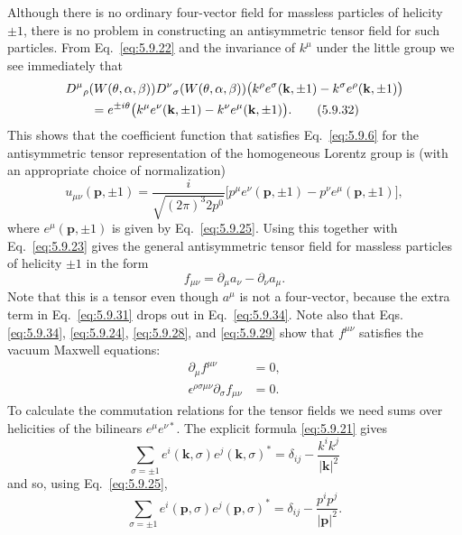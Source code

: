 Although there is no ordinary four-vector field for massless particles of
helicity $\pm1$, there is no problem in constructing an antisymmetric tensor
field for such particles. From Eq.~\eqref{eq:5.9.22} and the invariance of $k^\mu$ under
the little group we see immediately that
\begin{align}
&D^\mu{}_\rho(W(\theta,\alpha,\beta))
D^\nu{}_\sigma(W(\theta,\alpha,\beta))
\bigl(k^\rho e^\sigma(\mathbf k,\pm1)-k^\sigma e^\rho(\mathbf k,\pm1)\bigr)
\notag\\
&\qquad=e^{\pm i\theta}
\bigl(k^\mu e^\nu(\mathbf k,\pm1)-k^\nu e^\mu(\mathbf k,\pm1)\bigr).
\tag{5.9.32}\label{eq:5.9.32}
\end{align}
This shows that the coefficient function that satisfies Eq.~\eqref{eq:5.9.6} for the
antisymmetric tensor representation of the homogeneous Lorentz group is (with
an appropriate choice of normalization)
\begin{equation}
u_{\mu\nu}(\mathbf p,\pm1)=\frac{i}{\sqrt{(2\pi)^3 2p^0}}
\bigl[p^\mu e^\nu(\mathbf p,\pm1)-p^\nu e^\mu(\mathbf p,\pm1)\bigr],
\tag{5.9.33}\label{eq:5.9.33}
\end{equation}
where $e^\mu(\mathbf p,\pm1)$ is given by Eq.~\eqref{eq:5.9.25}. Using this together
with Eq.~\eqref{eq:5.9.23} gives the general antisymmetric tensor field for massless
particles of helicity $\pm1$ in the form
\begin{equation}
f_{\mu\nu}=\partial_\mu a_\nu-\partial_\nu a_\mu.
\tag{5.9.34}\label{eq:5.9.34}
\end{equation}
Note that this is a tensor even though $a^\mu$ is not a four-vector, because
the extra term in Eq.~\eqref{eq:5.9.31} drops out in Eq.~\eqref{eq:5.9.34}. Note also that Eqs.
\eqref{eq:5.9.34}, \eqref{eq:5.9.24}, \eqref{eq:5.9.28}, and \eqref{eq:5.9.29} show that $f^{\mu\nu}$ satisfies the
vacuum Maxwell equations:
\begin{align}
\partial_\mu f^{\mu\nu}&=0,
\tag{5.9.35}\label{eq:5.9.35}\\
\epsilon^{\rho\sigma\mu\nu}\partial_\sigma f_{\mu\nu}&=0.
\tag{5.9.36}\label{eq:5.9.36}
\end{align}
To calculate the commutation relations for the tensor fields we need sums over
helicities of the bilinears $e^\mu e^{\nu*}$. The explicit formula \eqref{eq:5.9.21}
gives
\[
\sum_{\sigma=\pm1}e^i(\mathbf k,\sigma)e^j(\mathbf k,\sigma)^*
=\delta_{ij}-\frac{k^ik^j}{|\mathbf k|^2}
\]
and so, using Eq.~\eqref{eq:5.9.25},
\begin{equation}
\sum_{\sigma=\pm1}e^i(\mathbf p,\sigma)e^j(\mathbf p,\sigma)^*
=\delta_{ij}-\frac{p^ip^j}{|\mathbf p|^2}.
\tag{5.9.37}\label{eq:5.9.37}
\end{equation}
